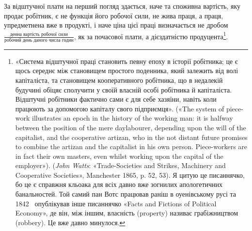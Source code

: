 
За відштучної плати на перший погляд здається, наче та
споживна вартість, яку продає робітник, є не функція його
робочої сили, не жива праця, а праця, упредметнена вже в
продукті, і наче ціна цієї праці визначається не дробом
$\frac{\text{денна вартість робочої сили}}{\text{робочий день даного числа годин}}$,
як за почасової плати, а дієздатністю продуцента\footnote{
«Система відштучної праці становить певну епоху в історії робітника;
це є щось середнє між становищем простого поденника, який залежить
від волі капіталіста, та становищем кооперативного робітника, що
в недалекій будучині обіцяє сполучити у своїй власній особі робітника
й капіталіста. Відштучні робітники фактично сами є для себе хазяїни,
навіть коли працюють за допомогою капіталу свого підприємця». («The
system of piece-work illustrates an epoch in the history of the working
man: it is halfway between the position of the mere daylabourer, depending
upon the will of the capitalist, and the cooperative artizan, who in
the not distant future promises to combine the artizan and the capitalist
in his own person. Piece-workers are in fact their own masters, even whilst
working upon the capital of the employer»). (\emph{John Watts}: «Trade-Societies
and Strikes, Machinery and Cooperative Societies», Manchester 1865,
p. 52, 53). Я цитую це писаннячко, бо це є справжня кльоака для всіх
давно вже зогнилих апологетичних банальностей. Той самий пан Вотс
працював раніш в оуенівському русі та 1842~ опублікував інше писаннячко
«Facts and Fictions of Political Economy», де він, між іншим, власність
(property) називає грабіжництвом (robbery). Це вже давно минулося.
}.

